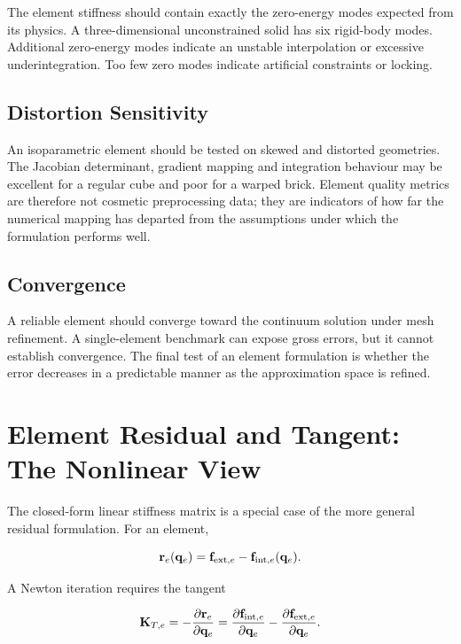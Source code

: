 The element stiffness should contain exactly the zero-energy modes expected from
its physics. A three-dimensional unconstrained solid has six rigid-body modes.
Additional zero-energy modes indicate an unstable interpolation or excessive
underintegration. Too few zero modes indicate artificial constraints or locking.

\subsection{Distortion Sensitivity}

An isoparametric element should be tested on skewed and distorted geometries.
The Jacobian determinant, gradient mapping and integration behaviour may be
excellent for a regular cube and poor for a warped brick. Element quality
metrics are therefore not cosmetic preprocessing data; they are indicators of
how far the numerical mapping has departed from the assumptions under which the
formulation performs well.

\subsection{Convergence}

A reliable element should converge toward the continuum solution under mesh
refinement. A single-element benchmark can expose gross errors, but it cannot
establish convergence. The final test of an element formulation is whether the
error decreases in a predictable manner as the approximation space is refined.

\section[Nonlinear Residual and Tangent]{Element Residual and Tangent: The Nonlinear View}

The closed-form linear stiffness matrix is a special case of the more general
residual formulation. For an element,

\begin{equation}
    \mathbf{r}_e(\mathbf{q}_e)
    =\mathbf{f}_{\mathrm{ext},e}
    -\mathbf{f}_{\mathrm{int},e}(\mathbf{q}_e).
\end{equation}

A Newton iteration requires the tangent

\begin{equation}
    \mathbf{K}_{T,e}
    =-\frac{\partial\mathbf{r}_e}{\partial\mathbf{q}_e}
    =\frac{\partial\mathbf{f}_{\mathrm{int},e}}{\partial\mathbf{q}_e}
      -\frac{\partial\mathbf{f}_{\mathrm{ext},e}}{\partial\mathbf{q}_e}.
\end{equation}

